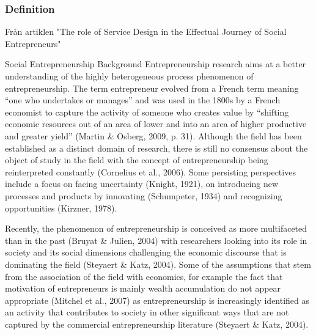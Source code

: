 \subsubsection{Definition}

Från artiklen "The role of Service Design in the Effectual Journey of Social Entrepreneurs" %

Social Entrepreneurship Background
Entrepreneurship research aims at a better understanding of the highly heterogeneous process phenomenon of entrepreneurship. The term entrepreneur evolved from a French term meaning “one who undertakes or manages” and was used in the 1800s by a French economist to capture the activity of someone who creates value by “shifting economic resources out of an area of lower and into an area of higher productive and greater yield” (Martin \& Osberg, 2009, p. 31). Although the field has been established as a distinct domain of research, there is still no consensus about the object of study in the field with the concept of entrepreneurship being reinterpreted constantly (Cornelius et al., 2006). Some persisting perspectives include a focus on facing uncertainty (Knight, 1921), on introducing new processes and products by innovating (Schumpeter, 1934) and recognizing opportunities (Kirzner, 1978).

Recently, the phenomenon of entrepreneurship is conceived as more multifaceted than in the past (Bruyat \& Julien, 2004) with researchers looking into its role in society and its social dimensions challenging the economic discourse that is dominating the field (Steyaert \& Katz, 2004). Some of the assumptions that stem from the association of the field with economics, for example the fact that motivation of entrepreneurs is mainly wealth accumulation do not appear appropriate (Mitchel et al., 2007) as entrepreneurship is increasingly identified as an activity that contributes to society in other significant ways that are not captured by the commercial entrepreneurship literature (Steyaert \& Katz, 2004).